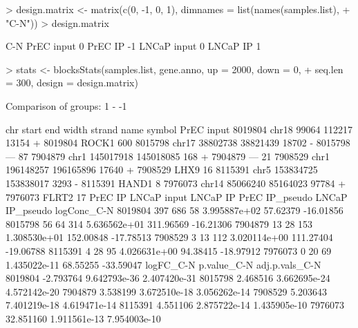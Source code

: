 \begin{Schunk}
\begin{Sinput}
> design.matrix <- matrix(c(0, -1, 0, 1), dimnames = list(names(samples.list), 
+     "C-N"))
> design.matrix
\end{Sinput}
\begin{Soutput}
            C-N
PrEC input    0
PrEC IP      -1
LNCaP input   0
LNCaP IP      1
\end{Soutput}
\begin{Sinput}
> stats <- blocksStats(samples.list, gene.anno, up = 2000, down = 0, 
+     seq.len = 300, design = design.matrix)
\end{Sinput}
\begin{Soutput}
Comparison of groups:  1 - -1 
\end{Soutput}
\begin{Soutput}
          chr     start       end width strand    name symbol PrEC input
8019804 chr18     99064    112217 13154      + 8019804  ROCK1        600
8015798 chr17  38802738  38821439 18702      - 8015798    ---         87
7904879  chr1 145017918 145018085   168      + 7904879    ---         21
7908529  chr1 196148257 196165896 17640      + 7908529   LHX9         16
8115391  chr5 153834725 153838017  3293      - 8115391  HAND1          8
7976073 chr14  85066240  85164023 97784      + 7976073  FLRT2         17
        PrEC IP LNCaP input LNCaP IP PrEC IP_pseudo LNCaP IP_pseudo logConc_C-N
8019804     397         686       58   3.995887e+02        57.62379   -16.01856
8015798      56          64      314   5.636562e+01       311.96569   -16.21306
7904879      13          28      153   1.308530e+01       152.00848   -17.78513
7908529       3          13      112   3.020114e+00       111.27404   -19.06788
8115391       4          28       95   4.026631e+00        94.38415   -18.97912
7976073       0          20       69   1.435022e-11        68.55255   -33.59047
        logFC_C-N  p.value_C-N adj.p.vals_C-N
8019804 -2.793764 9.642793e-36   2.407420e-31
8015798  2.468516 3.662695e-24   4.572142e-20
7904879  3.538199 3.672510e-18   3.056262e-14
7908529  5.203643 7.401219e-18   4.619471e-14
8115391  4.551106 2.875722e-14   1.435905e-10
7976073 32.851160 1.911561e-13   7.954003e-10
\end{Soutput}
\end{Schunk}
